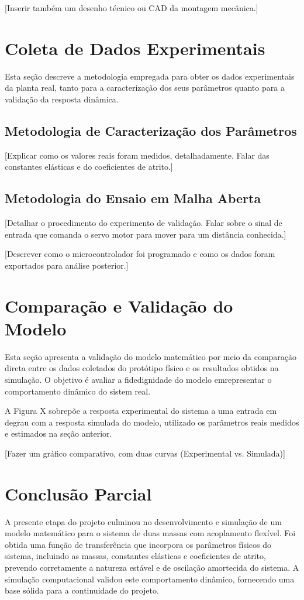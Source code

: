 \documentclass[9pt,a4paper,twocolumn,twoside]{tau-class/tau}
\begin{document}
[Inserir também um desenho técnico ou CAD da montagem mecânica.]

\section{Coleta de Dados Experimentais}
Esta seção descreve a metodologia empregada para obter os dados experimentais da planta real, tanto para a caracterização dos seus parâmetros quanto para a validação da resposta dinâmica.

\subsection{Metodologia de Caracterização dos Parâmetros}

[Explicar como os valores reais foram medidos, detalhadamente. Falar das constantes elásticas e do coeficientes de atrito.]

\subsection{Metodologia do Ensaio em Malha Aberta}
[Detalhar o procedimento do experimento de validação. Falar sobre o sinal de entrada que comanda o servo motor para mover para um distância conhecida.]

[Descrever como o microcontrolador foi programado e como os dados foram exportados para análise posterior.]


\section{Comparação e Validação do Modelo}
Esta seção apresenta a validação do modelo matemático por meio da comparação direta entre os dados coletados do protótipo físico e os resultados obtidos na simulação. O objetivo é avaliar a fidedignidade do modelo emrepresentar o comportamento dinâmico do sistem real.

A Figura X sobrepõe a resposta experimental do sistema a uma entrada em degrau com a resposta simulada do modelo, utilizado os parâmetros reais medidos e estimados na seção anterior.

[Fazer um gráfico comparativo, com duas curvas (Experimental vs. Simulada)]

\section{Conclusão Parcial}

 A presente etapa do projeto culminou no desenvolvimento e simulação de um modelo matemático para o sistema de duas massas com acoplamento flexível. Foi obtida uma função de transferência que incorpora os parâmetros físicos do sistema, incluindo as massas, constantes elásticas e coeficientes de atrito, prevendo corretamente a natureza estável e de oscilação amortecida do sistema. A simulação computacional validou este comportamento dinâmico, fornecendo uma base sólida para a continuidade do projeto.
\end{document}
